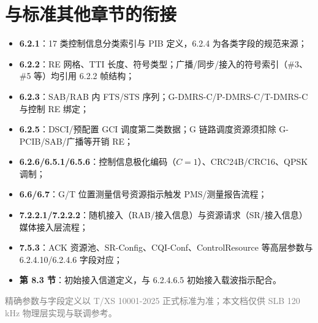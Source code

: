 \documentclass[11pt,a4paper]{ctexart}
\begin{document}
\section{与标准其他章节的衔接}

\begin{itemize}[nosep]
  \item \textbf{6.2.1}：17 类控制信息分类索引与 PIB 定义，6.2.4 为各类字段的规范来源；
  \item \textbf{6.2.2}：RE 网格、TTI 长度、符号类型；广播/同步/接入的符号索引（\#3、\#5 等）均引用 6.2.2 帧结构；
  \item \textbf{6.2.3}：SAB/RAB 内 FTS/STS 序列；G-DMRS-C/P-DMRS-C/T-DMRS-C 与控制 RE 绑定；
  \item \textbf{6.2.5}：DSCI/预配置 GCI 调度第二类数据；G 链路调度资源须扣除 G-PCIB/SAB/广播等开销 RE；
  \item \textbf{6.2.6/6.5.1/6.5.6}：控制信息极化编码（$C=1$）、CRC24B/CRC16、QPSK 调制；
  \item \textbf{6.6/6.7}：G/T 位置测量信号资源指示触发 PMS/测量报告流程；
  \item \textbf{7.2.2.1/7.2.2.2}：随机接入（RAB/接入信息）与资源请求（SR/接入信息）媒体接入层流程；
  \item \textbf{7.5.3}：ACK 资源池、SR-Config、CQI-Conf、ControlResource 等高层参数与 6.2.4.10/6.2.4.6 字段对应；
  \item \textbf{第 8.3 节}：初始接入信道定义，与 6.2.4.6.5 初始接入载波指示配合。
\end{itemize}

\vfill
\begin{center}
\small\textcolor{gray}{精确参数与字段定义以 T/XS 10001-2025 正式标准为准；本文档仅供 SLB 120\,kHz 物理层实现与联调参考。}
\end{center}
\end{document}
